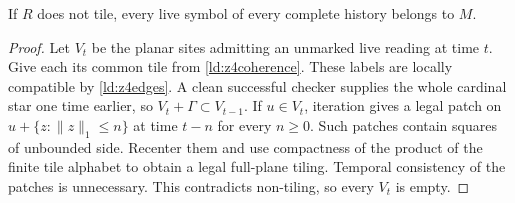 \begin{lemma}\label{ld:z4extract}
If $R$ does not tile, every live symbol of every complete history belongs to $M$.
\end{lemma}
\begin{proof}
Let $V_t$ be the planar sites admitting an unmarked live reading at time $t$. Give each its common tile from \cref{ld:z4coherence}. These labels are locally compatible by \cref{ld:z4edges}. A clean successful checker supplies the whole cardinal star one time earlier, so $V_t+\Gamma\subset V_{t-1}$. If $u\in V_t$, iteration gives a legal patch on $u+\{z:\|z\|_1\le n\}$ at time $t-n$ for every $n\ge0$. Such patches contain squares of unbounded side. Recenter them and use compactness of the product of the finite tile alphabet to obtain a legal full-plane tiling. Temporal consistency of the patches is unnecessary. This contradicts non-tiling, so every $V_t$ is empty.
\end{proof}

